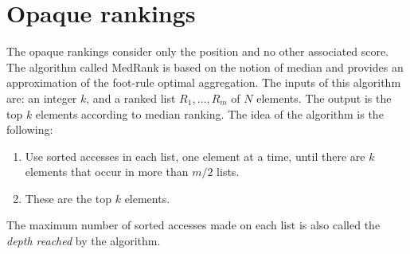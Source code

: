 \documentclass[12pt, a4paper]{report}
\begin{document}
    \section{Opaque rankings}
    The opaque rankings consider only the position and no other associated score. The algorithm called MedRank is based on the notion of 
    median and provides an approximation of the foot-rule optimal aggregation. The inputs of this algorithm are: an integer $k$, and a ranked list 
    $R_1,\dots,R_m$ of $N$ elements. The output is the top $k$ elements according to median ranking. The idea of the algorithm is the following: 
    \begin{enumerate}
        \item Use sorted accesses in each list, one element at a time, until there are $k$ elements that occur in more than $m/2$ lists.
        \item These are the top $k$ elements. 
    \end{enumerate}
    \begin{definition}
        The maximum number of sorted accesses made on each list is also called the \emph{depth reached} by the algorithm. 
    \end{definition}
\end{document}
